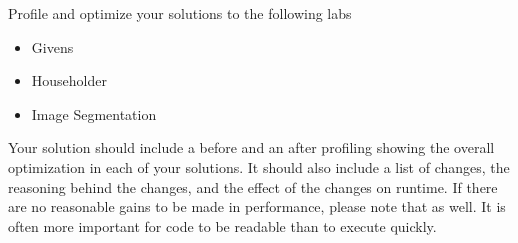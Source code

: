 \begin{problem}
Profile and optimize your solutions to the following labs
\begin{itemize}
\item Givens
\item Householder
\item Image Segmentation
\end{itemize}
Your solution should include a before and an after profiling showing the overall optimization in each of your solutions.  It should also include a list of changes, the reasoning behind the changes, and the effect of the changes on runtime.  If there are no reasonable gains to be made in performance, please note that as well.  It is often more important for code to be readable than to execute quickly.
\end{problem}

